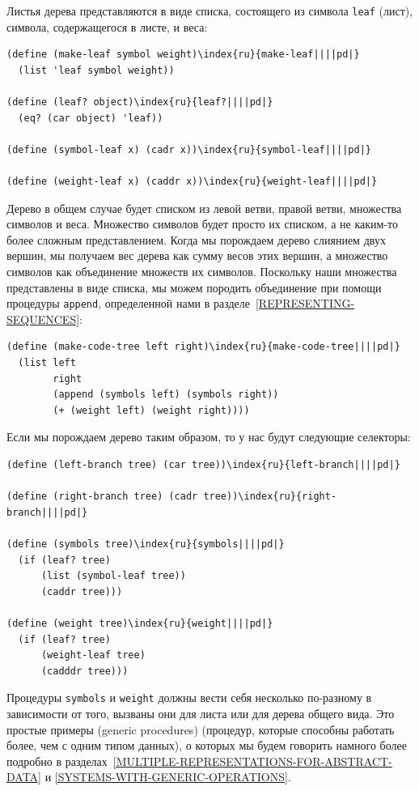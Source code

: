 Листья дерева представляются в виде списка, состоящего из 
символа {\tt leaf} (лист), символа, содержащегося в листе, и
веса:

\begin{Verbatim}[fontsize=\small]
(define (make-leaf symbol weight)\index{ru}{make-leaf||||pd|}
  (list 'leaf symbol weight))

(define (leaf? object)\index{ru}{leaf?||||pd|}
  (eq? (car object) 'leaf))

(define (symbol-leaf x) (cadr x))\index{ru}{symbol-leaf||||pd|}

(define (weight-leaf x) (caddr x))\index{ru}{weight-leaf||||pd|}
\end{Verbatim}
Дерево в общем случае будет списком из левой ветви, правой ветви,
множества символов и веса.  Множество символов будет просто их
списком, а не каким-то более сложным представлением.  Когда мы
порождаем дерево слиянием двух вершин, мы получаем вес дерева как
сумму весов этих вершин, а множество символов как объединение множеств 
их символов.  Поскольку наши множества представлены в виде списка, мы
можем породить объединение при помощи процедуры {\tt append},
определенной нами в разделе~\ref{REPRESENTING-SEQUENCES}:

\begin{Verbatim}[fontsize=\small]
(define (make-code-tree left right)\index{ru}{make-code-tree||||pd|}
  (list left
        right
        (append (symbols left) (symbols right))
        (+ (weight left) (weight right))))
\end{Verbatim}
Если мы порождаем дерево таким образом, то у нас будут следующие
селекторы:

\begin{Verbatim}[fontsize=\small]
(define (left-branch tree) (car tree))\index{ru}{left-branch||||pd|}

(define (right-branch tree) (cadr tree))\index{ru}{right-branch||||pd|}

(define (symbols tree)\index{ru}{symbols||||pd|}
  (if (leaf? tree)
      (list (symbol-leaf tree))
      (caddr tree)))

(define (weight tree)\index{ru}{weight||||pd|}
  (if (leaf? tree)
      (weight-leaf tree)
      (cadddr tree)))
\end{Verbatim}
Процедуры {\tt symbols} и {\tt weight} должны вести себя 
несколько по-разному в зависимости от того, вызваны они для листа или
для дерева общего вида.  Это простые примеры  
 (generic procedures) 
(процедур, которые способны работать 
более, чем с одним типом данных), о которых мы будем говорить намного
более подробно в разделах~\ref{MULTIPLE-REPRESENTATIONS-FOR-ABSTRACT-DATA}
и \ref{SYSTEMS-WITH-GENERIC-OPERATIONS}.

